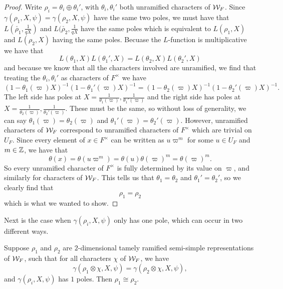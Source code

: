 \begin{proof}
  Write $\rho_i = \theta_i \oplus \theta_i'$, with $\theta_i, \theta_i'$ both unramified characters of $\mathcal{W}_F$.
  Since $\gamma(\rho_1,X,\psi) = \gamma(\rho_2,X,\psi)$ have the same two poles, we must have that $L(\check{\rho_1},\frac{1}{qX})$ and $L(\check{\rho_2},\frac{1}{qX}$ have the same poles which is equivalent to $L(\rho_1,X)$ and $L(\rho_2,X)$ having the same poles.
  Becuase the $L$-function is multiplicative we have that
  \[L(\theta_1,X)L(\theta_1',X) = L(\theta_2,X)L(\theta_2',X)\]
  and because we know that all the characters involved are unramified, we find that treating the $\theta_i,\theta_i'$ as characters of $F^\times$ we have
  \[(1 - \theta_1(\varpi)X)^{-1}(1 - \theta_1'(\varpi)X)^{-1} = (1 - \theta_2(\varpi)X)^{-1}(1 - \theta_2'(\varpi)X)^{-1}.\]
  The left side has poles at $X =  \frac{1}{\theta_1(\varpi)}, \frac{1}{\theta_1'(\varpi)}$ and the right side has poles at $X =  \frac{1}{\theta_2(\varpi)}, \frac{1}{\theta_2'(\varpi)}$.
  These must be the same, so without loss of generality, we can say $\theta_1(\varpi) = \theta_2(\varpi)$ and $\theta_1'(\varpi) = \theta_2'(\varpi)$.
  However, unramified characters of $\mathcal{W}_F$ correspond to unramified characters of $F^\times$ which are trivial on $U_F$.
  Since every element of $x \in F^\times$ can be written as $u\varpi^m$ for some $u \in U_F$ and $m \in \mathbb{Z}$, we have that
  \[\theta(x) = \theta(u\varpi^m) = \theta(u) \theta(\varpi)^m = \theta(\varpi)^m.\]
  So every unramified character of $F^\times$ is fully determined by its value on $\varpi$, and similarly for characters of $\mathcal{W}_F$.
  This tells us that $\theta_1 = \theta_2$ and $\theta_1' = \theta_2'$, so we clearly find that \[\rho_1 = \rho_2\] which is what we wanted to show.
\end{proof}

Next is the case when $\gamma(\rho_i, X,\psi)$ only has one pole, which can occur in two different ways. 

\begin{lemma}
  \label{lem:gamma-one-pole}
  Suppose $\rho_1$ and $\rho_2$ are $2$-dimensional tamely ramified semi-simple representations of $\mathcal{W}_F$, such that for all characters $\chi$ of $\mathcal{W}_F$, we have
  \[\gamma(\rho_1 \otimes \chi,X,\psi) = \gamma(\rho_2 \otimes \chi,X,\psi),\]
  and $\gamma(\rho_i,X,\psi)$ has $1$ poles.
  Then $\rho_1 \cong \rho_2$.
\end{lemma}

